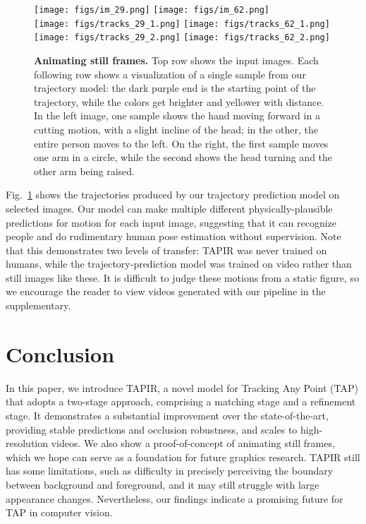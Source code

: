 \documentclass[10pt,twocolumn,letterpaper]{article}
\begin{document}
\begin{figure}[t]
\begin{center}
   \texttt{[image: figs/im\_29.png]}
   \texttt{[image: figs/im\_62.png]}\\
   \texttt{[image: figs/tracks\_29\_1.png]}
   \texttt{[image: figs/tracks\_62\_1.png]}\\
   \texttt{[image: figs/tracks\_29\_2.png]}
   \texttt{[image: figs/tracks\_62\_2.png]}
\end{center}
   \caption{\textbf{Animating still frames.} Top row shows the input images. Each following row shows a visualization of a single sample from our trajectory model: the dark purple end is the starting point of the trajectory, while the colors get brighter and yellower with distance.  In the left image, one sample shows the hand moving forward in a cutting motion, with a slight incline of the head; in the other, the entire person moves to the left.  On the right, the first sample moves one arm in a circle, while the second shows the head turning and the other arm being raised.}
\label{fig:animate}
\end{figure}


Fig.~\ref{fig:animate} shows the trajectories produced by our trajectory prediction model on selected images.  
Our model can make multiple different physically-plausible predictions for motion for each input image, suggesting that it can recognize people and do rudimentary human pose estimation without supervision.  Note that this demonstrates two levels of transfer: TAPIR was never trained on humans, while the trajectory-prediction model was trained on video rather than still images like these.  It is difficult to judge these motions from a static figure, so we encourage the reader to view videos generated with our pipeline in the supplementary.


\section{Conclusion}
In this paper, we introduce TAPIR, a novel model for Tracking Any Point (TAP) that adopts a two-stage approach, comprising a matching stage and a refinement stage.  It demonstrates a substantial improvement over the state-of-the-art, providing stable predictions and occlusion robustness, and scales to high-resolution videos. We also show a proof-of-concept of animating still frames, which we hope can serve as a foundation for future graphics research. TAPIR still has some limitations, such as difficulty in precisely perceiving the boundary between background and foreground, and it may still struggle with large appearance changes. Nevertheless, our findings indicate a promising future for TAP in computer vision.
\end{document}
